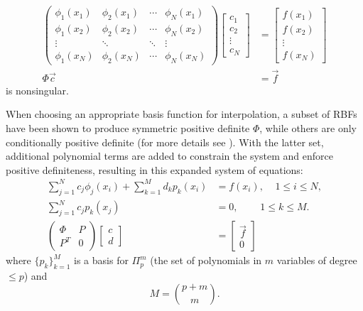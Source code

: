 \documentclass{report}
\begin{document}
{\begin{align*}
          \begin{pmatrix}  
            \phi_1(x_1) & \phi_2(x_1) & \cdots & \phi_N(x_1) \\ 
            \phi_1(x_2) & \phi_2(x_2) & \cdots & \phi_N(x_2) \\ 
            \vdots & \ddots & \ddots & \vdots \\
            \phi_1(x_N) & \phi_2(x_N) & \cdots & \phi_N(x_N)
                \end{pmatrix} 
                \begin{bmatrix} c_1 \\ c_2 \\ \vdots \\ c_N \end{bmatrix}
               &=                \begin{bmatrix} f(x_1) \\ f(x_2) \\ \vdots \\ f(x_N) \end{bmatrix} \\
                         \Phi \vec{c} &= \vec{f} 
        \end{align*} 
is nonsingular.

 When choosing an appropriate basis function for interpolation, a
    subset of RBFs have been shown to produce symmetric positive definite
    $\Phi$, while others are only conditionally positive definite (for more details see
    \cite{Fasshauer2007}).  With
    the latter set, additional polynomial terms are added to constrain the
    system and enforce positive definiteness, resulting in this expanded system of equations: 
        \begin{align} 
        \sum_{j=1}^{N} c_j \phi_j(x_i) + \sum_{k=1}^{M}d_k p_k(x_i) &= f(x_i),\ \ \ \ \ 1
        \leq i \leq N, \nonumber \\ 
        \sum_{j=1}^{N} c_j p_k(x_j) &=  0,\ \ \ \ \ \ \ \ \ \ 1 \leq k \leq M. \nonumber \\
          \begin{pmatrix} \Phi & P \\ P^T & 0 \end{pmatrix} \begin{bmatrix} c \\ d \end{bmatrix} &= \begin{bmatrix} \vec{f} \\ 0 \end{bmatrix}
	\label{eq:additional_constraints}
        \end{align} 
        where $\{p_k\}_{k=1}^{M}$ is a basis for $\Pi_{p}^{m} $ (the set of polynomials in $m$ variables of degree $\leq p$) and 
       \begin{equation*}
       M = {{p+m}\choose{m}}       .
       \end{equation*} 


}
\end{document}
